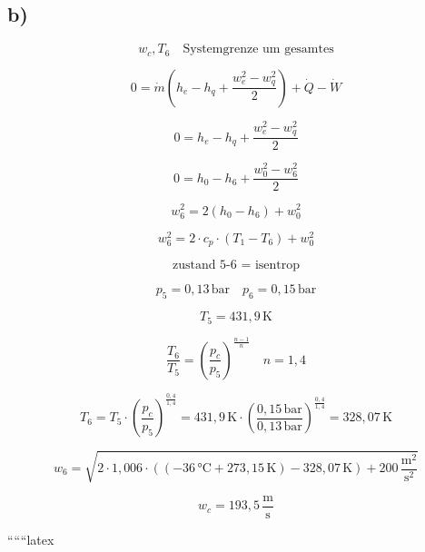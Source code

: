 

\subsection*{b)}

\[
w_c, T_6 \quad \text{Systemgrenze um gesamtes}
\]

\[
0 = \dot{m} \left( h_e - h_q + \frac{w_e^2 - w_q^2}{2} \right) + \dot{Q} - \dot{W}
\]

\[
0 = h_e - h_q + \frac{w_e^2 - w_q^2}{2}
\]

\[
0 = h_0 - h_6 + \frac{w_0^2 - w_6^2}{2}
\]

\[
w_6^2 = 2 \left( h_0 - h_6 \right) + w_0^2
\]

\[
w_6^2 = 2 \cdot c_p \cdot \left( T_1 - T_6 \right) + w_0^2
\]

\[
\text{zustand 5-6 = isentrop}
\]

\[
p_5 = 0,13 \, \text{bar} \quad p_6 = 0,15 \, \text{bar}
\]

\[
T_5 = 431,9 \, \text{K}
\]

\[
\frac{T_6}{T_5} = \left( \frac{p_c}{p_5} \right)^{\frac{n-1}{n}} \quad n = 1,4
\]

\[
T_6 = T_5 \cdot \left( \frac{p_c}{p_5} \right)^{\frac{0,4}{1,4}} = 431,9 \, \text{K} \cdot \left( \frac{0,15 \, \text{bar}}{0,13 \, \text{bar}} \right)^{\frac{0,4}{1,4}} = 328,07 \, \text{K}
\]

\[
w_6 = \sqrt{2 \cdot 1,006 \cdot \left( (-36 \, \text{°C} + 273,15 \, \text{K}) - 328,07 \, \text{K} \right) + 200 \, \frac{\text{m}^2}{\text{s}^2}}
\]

\[
w_c = 193,5 \, \frac{\text{m}}{\text{s}}
\]

``````latex